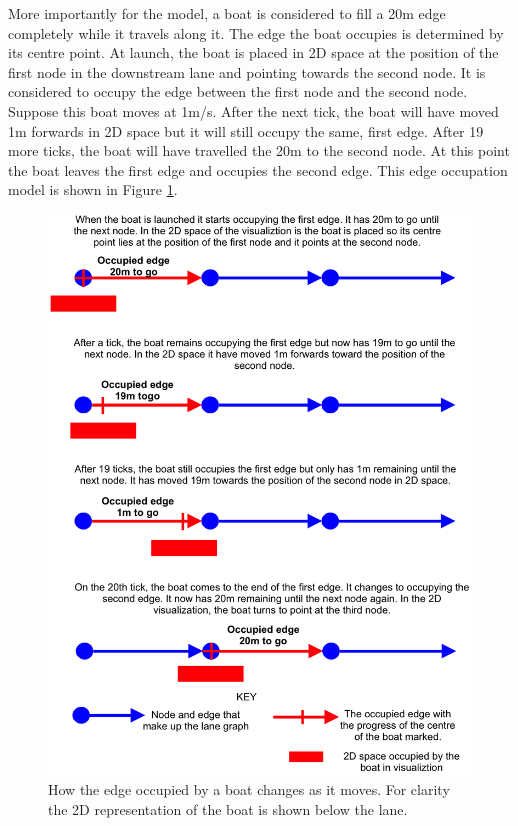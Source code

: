       More importantly for the model, a boat is considered to fill a 20m edge completely while it travels along it. The edge the boat occupies is determined by its centre point. At launch, the boat is placed in 2D space at the position of the first node in the downstream lane and pointing towards the second node. It is considered to occupy the edge between the first node and the second node. Suppose this boat moves at 1m/s. After the next tick, the boat will have moved 1m forwards in 2D space but it will still occupy the same, first edge. After 19 more ticks, the boat will have travelled the 20m to the second node. At this point the boat leaves the first edge and occupies the second edge. This edge occupation model is shown in Figure \ref{fig:model:edgeoccupation}.
      
      \begin{figure}
      \begin{center}
      	\includegraphics[scale=0.45]{images/edgeoccupation.png}
      	\caption{How the edge occupied by a boat changes as it moves. For clarity the 2D representation of the boat is shown below the lane.}
      	\label{fig:model:edgeoccupation}
      \end{center}
      \end{figure}
      
